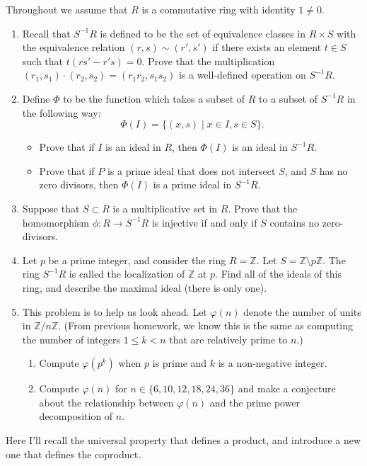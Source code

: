 \documentclass[12pt]{article}
\newcommand{\bbZ}{\mathbb{Z}}
\begin{document}
\pagestyle{fancy}

Throughout we assume that $R$ is a commutative ring with identity
$1\neq 0$.
\begin{enumerate}
\item Recall that $S^{-1}R$ is defined to be the set of equivalence
  classes in $R\times S$ with the equivalence relation $(r,s)\sim
  (r',s')$ if there exists an element $t\in S$ such that
  $t(rs'-r's)=0$. Prove that the multiplication $(r_1,s_1)\cdot
  (r_2,s_2)=(r_1r_2,s_1s_2)$ is a well-defined operation on
  $S^{-1}R$. 
\item Define $\Phi$ to be the
  function which takes a subset of $R$ to a subset of $S^{-1}R$ in the
  following way: 
  \[\Phi(I) = \{(x,s) \mid x\in I, s\in S\}.\]
  \begin{itemize}
  \item Prove that if $I$ is an ideal in $R$, then $\Phi(I)$ is an
    ideal in $S^{-1}R$. 
  \item Prove that if $P$ is a prime ideal that does not intersect
    $S$, and $S$ has no zero divisors, then $\Phi(I)$ is a prime ideal
    in $S^{-1}R$. 
  \end{itemize}


\item Suppose that $S\subset R$ is a multiplicative set in $R$. Prove
  that the homomorphism $\phi: R\rightarrow S^{-1}R$ is injective if
  and only if $S$ contains no zero-divisors. 
\item Let $p$ be a prime integer, and consider the ring $R=\bbZ$. Let
  $S=\bbZ \setminus p\bbZ$. The ring $S^{-1}R$ is called the
  localization of $\bbZ$ at $p$. Find all of the ideals of this ring,
  and describe the maximal ideal (there is only one).
\item This problem is to help us look ahead. Let $\varphi(n)$ denote
  the number of units in $\bbZ/n\bbZ$. (From previous homework, we
  know this is the same as computing the number of integers $1\leq k<n$
  that are relatively prime to $n$.)
\begin{enumerate}
\item Compute $\varphi(p^k)$ when $p$ is prime and $k$ is a
  non-negative integer.
\item Compute $\varphi(n)$ for $n\in \{6, 10, 12, 18, 24, 36\}$ and make a
  conjecture about the relationship between $\varphi(n)$ and the prime
  power decomposition of $n$. 
\end{enumerate}

\end{enumerate}
Here I'll recall the universal property that defines a product, and
introduce a new one that defines the coproduct. 
\end{document}

